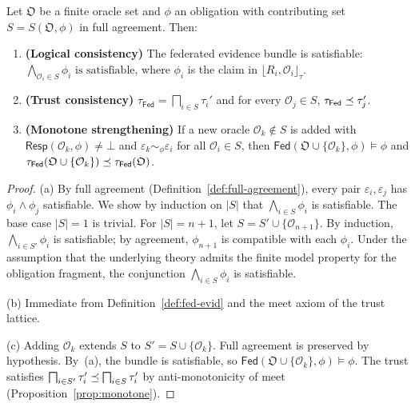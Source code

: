 \documentclass[11pt]{article}
\newcommand{\Oracle}{\mathcal{O}}            %
\newcommand{\OrcSet}{\mathfrak{O}}           %
\newcommand{\Orcl}[1]{\Oracle_{#1}}         %
\newcommand{\Fed}{\mathsf{Fed}}             %
\newcommand{\Ceil}[1]{\lfloor #1 \rfloor_{\tau}}   %
\newcommand{\Resp}{\mathsf{Resp}}           %
\begin{document}
\begin{theorem}\label{thm:fed-consistency}
  Let $\OrcSet$ be a finite oracle set and $\phi$ an obligation with
  contributing set $S = S(\OrcSet, \phi)$ in full agreement.  Then:
  \begin{enumerate}[label=(\alph*)]
    \item \textbf{(Logical consistency)}
          The federated evidence bundle is satisfiable:
          $\bigwedge_{\Orcl{i} \in S}
           \phi_i \text{ is satisfiable}$,
          where $\phi_i$ is the claim in $\Ceil{R_i, \Orcl{i}}$.
    \item \textbf{(Trust consistency)}
          $\tau_{\Fed} = \bigsqcap_{i \in S} \tau_i'$ and for every
          $\Orcl{j} \in S$, $\tau_{\Fed} \tleq \tau_j'$.
    \item \textbf{(Monotone strengthening)}
          If a new oracle $\Orcl{k} \notin S$ is added with
          $\Resp(\Orcl{k}, \phi) \neq \bot$ and
          $\varepsilon_k \sim_\phi \varepsilon_i$ for all
          $\Orcl{i} \in S$,
          then $\Fed(\OrcSet \cup \{\Orcl{k}\}, \phi) \models \phi$ and
          $\tau_{\Fed}(\OrcSet \cup \{\Orcl{k}\})
           \tleq \tau_{\Fed}(\OrcSet)$.
  \end{enumerate}
\end{theorem}
\begin{proof}
  (a) By full agreement (Definition~\ref{def:full-agreement}), every pair
  $\varepsilon_i, \varepsilon_j$ has $\phi_i \wedge \phi_j$ satisfiable.
  We show by induction on $|S|$ that $\bigwedge_{i \in S} \phi_i$ is
  satisfiable.  The base case $|S| = 1$ is trivial.  For $|S| = n + 1$,
  let $S = S' \cup \{\Orcl{n+1}\}$.  By induction, $\bigwedge_{i \in S'}
  \phi_i$ is satisfiable; by agreement, $\phi_{n+1}$ is compatible with
  each $\phi_i$.  Under the assumption that the underlying theory admits
  the finite model property for the obligation fragment, the conjunction
  $\bigwedge_{i \in S} \phi_i$ is satisfiable.

  \noindent(b) Immediate from Definition~\ref{def:fed-evid} and the
  meet axiom of the trust lattice.

  \noindent(c) Adding $\Orcl{k}$ extends $S$ to $S' = S \cup \{\Orcl{k}\}$.
  Full agreement is preserved by hypothesis.  By~(a), the bundle is
  satisfiable, so $\Fed(\OrcSet \cup \{\Orcl{k}\}, \phi) \models \phi$.
  The trust satisfies $\bigsqcap_{i \in S'} \tau_i' \preceq
  \bigsqcap_{i \in S} \tau_i'$ by anti-monotonicity of meet
  (Proposition~\ref{prop:monotone}).
\end{proof}
\end{document}
